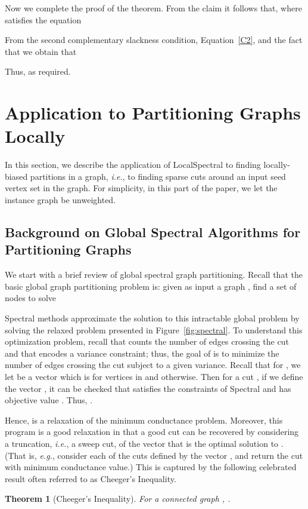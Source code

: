 \documentclass[11pt]{article}
\newtheorem{theorem}{Theorem}
\begin{document}
\noindent
Now we complete the proof of the theorem.
From the claim it follows that,  where  satisfies the equation 

From the second complementary slackness condition, 
Equation~\eqref{C2},
and the fact that  we obtain that 
 
Thus, 
 as required. 


\section{Application to Partitioning Graphs Locally}
\label{sxn:partition}

In this section, we describe the application of \textsf{LocalSpectral} to 
finding locally-biased partitions in a graph, \emph{i.e.}, to finding 
sparse cuts around an input seed vertex set in the graph.
For simplicity, in this part of the paper, we let the instance graph  be 
unweighted. 


\subsection{Background on Global Spectral Algorithms for Partitioning Graphs}
\label{sxn:partition-background}

We start with a brief review of global spectral graph partitioning.
Recall that the basic global graph partitioning problem is: given as input 
a graph , find a set of nodes  to solve 

Spectral methods approximate the solution to this intractable global problem 
by solving the relaxed problem  presented in 
Figure~\ref{fig:spectral}.
To understand this optimization problem, recall that  counts the 
number of edges crossing the cut and that  encodes a variance 
constraint; thus, the goal of  is to minimize the 
number of edges crossing the cut subject to a given variance. 
Recall that for , we let  be a vector 
which is  for vertices in  and  otherwise.
Then for  a cut , if we define the vector 
, 
it can be checked that  satisfies the constraints of \textsf{Spectral} 
and has objective value . 
Thus, . 

Hence,  is a relaxation of the minimum conductance 
problem. 
Moreover, this program is a good relaxation in that a good cut can be 
recovered by considering a truncation, \emph{i.e.}, a sweep cut, of the
vector  that is the optimal solution to .
(That is, \emph{e.g.}, consider each of the  cuts defined by the vector 
, and return the cut with minimum conductance value.)
This is captured by the following celebrated result often referred to as 
Cheeger's Inequality.
\begin{theorem}[Cheeger's Inequality]
\label{thm:cheeger1}
For a connected graph , 
.
\end{theorem}
\end{document}
